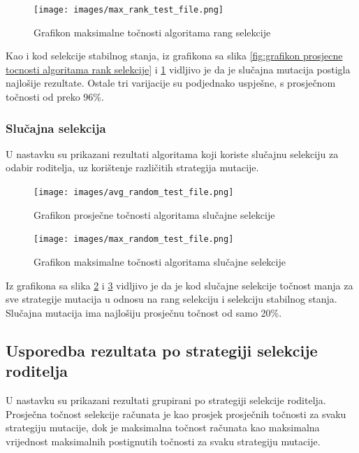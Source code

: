 \documentclass[times, utf8, zavrsni, numeric]{fer}
\begin{document}
\begin{figure}[h]
\centering
\texttt{[image: images/max\_rank\_test\_file.png]}
\caption{Grafikon maksimalne točnosti algoritama rang selekcije}
\label{fig:grafikon maksimalne tocnosti algoritama rank selekcije}
\end{figure}

Kao i kod selekcije stabilnog stanja, iz  grafikona sa slika \ref{fig:grafikon prosjecne tocnosti algoritama rank selekcije} i \ref{fig:grafikon maksimalne tocnosti algoritama rank selekcije} vidljivo je da je slučajna mutacija postigla najlošije rezultate. Ostale tri varijacije su podjednako uspješne, s prosječnom točnosti od preko 96\%.

\newpage
\subsubsection{Slučajna selekcija}
U nastavku su prikazani rezultati algoritama koji koriste slučajnu selekciju za odabir roditelja, uz korištenje različitih strategija mutacije.

\begin{figure}[h]
\centering
\texttt{[image: images/avg\_random\_test\_file.png]}
\caption{Grafikon prosječne točnosti algoritama slučajne selekcije}
\label{fig:grafikon prosjecne tocnosti algoritama slucajne selekcije}
\end{figure}

\begin{figure}[h]
\centering
\texttt{[image: images/max\_random\_test\_file.png]}
\caption{Grafikon maksimalne točnosti algoritama slučajne selekcije}
\label{fig:grafikon maksimalne tocnosti algoritama slucajne selekcije}
\end{figure}

Iz grafikona sa slika \ref{fig:grafikon prosjecne tocnosti algoritama slucajne selekcije} i \ref{fig:grafikon maksimalne tocnosti algoritama slucajne selekcije} vidljivo je da je kod slučajne selekcije točnost manja za sve strategije mutacija u odnosu na rang selekciju i selekciju stabilnog stanja. Slučajna mutacija ima najlošiju prosječnu točnost od samo 20\%.

\newpage
\subsection{Usporedba rezultata po strategiji selekcije roditelja}
U nastavku su prikazani rezultati grupirani po strategiji selekcije roditelja. Prosječna točnost selekcije računata je kao prosjek prosječnih točnosti za svaku strategiju mutacije, dok je maksimalna točnost računata kao maksimalna vrijednost maksimalnih postignutih točnosti za svaku strategiju mutacije.
\end{document}
